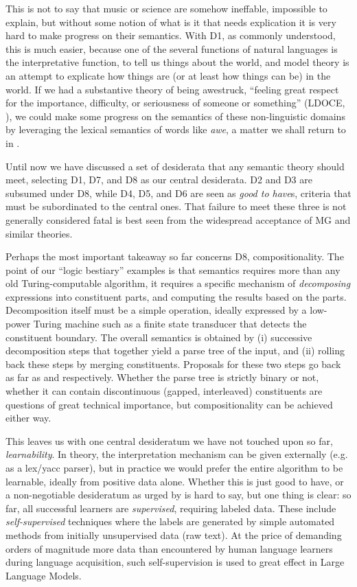 \documentclass[output=paper]{langscibook}
\begin{document}
This is not to say that music or science are somehow ineffable, impossible to
explain, but without some notion of what is it that needs explication it is
very hard to make progress on their semantics. With D1, as commonly
understood, this is much easier, because one of the several functions of
natural languages is the interpretative function, to tell us things about the
world, and model theory is an attempt to explicate how things are (or at least
how things can be) in the world. If we had a substantive theory of being
awestruck, ``feeling great respect for the importance, difficulty, or
seriousness of someone or something'' (LDOCE, \cite{Procter:1978}), we could
make some progress on the semantics of these non-linguistic domains by
leveraging the lexical semantics of words like \textit{awe}, a matter we shall
return to in .

Until now we have discussed a set of desiderata that any
semantic theory should meet, selecting D1, D7, and D8 as our central
desiderata. D2 and D3 are subsumed under D8, while D4, D5, and D6 are seen as
\textit{good to have}s, criteria that must be subordinated to the central
ones. That failure to meet these three is not generally considered fatal is
best seen from the widespread acceptance of MG and similar theories.

Perhaps the most important takeaway so far concerns D8, compositionality. The
point of our ``logic bestiary'' examples is that semantics requires more than
any old Turing-computable algorithm, it requires a specific mechanism of \textit{  decomposing} expressions into constituent parts, and computing the results
based on the parts. Decomposition itself must be a simple operation, ideally
expressed by a low-power Turing machine such as a finite state transducer that
detects the constituent boundary. The overall semantics is obtained by (i)
successive decomposition steps that together yield a parse tree of the input,
and (ii) rolling back these steps by merging constituents. Proposals for these
two steps go back as far as \citet{Wells:1947} and \citet{Knuth:1968}
respectively. Whether the parse tree is strictly binary or not, whether it can
contain discontinuous (gapped, interleaved) constituents are questions of
great technical importance, but compositionality can be achieved either way.

This leaves us with one central desideratum we have not touched upon so far,
\textit{learnability}. In theory, the interpretation mechanism can be given
externally (e.g. as a lex/yacc parser), but in practice we would prefer the
entire algorithm to be learnable, ideally from positive data alone. Whether
this is just good to have, or a non-negotiable desideratum as urged by
\citet{Chomsky:1965} is hard to say, but one thing is clear: so far, all
successful learners are \textit{supervised}, requiring labeled data. These
include \textit{self-supervised} techniques where the labels are generated by
simple automated methods from initially unsupervised data (raw text). At the
price of demanding orders of magnitude more data than encountered by human
language learners during language acquisition, such self-supervision is used
to great effect in Large Language Models.
\end{document}
